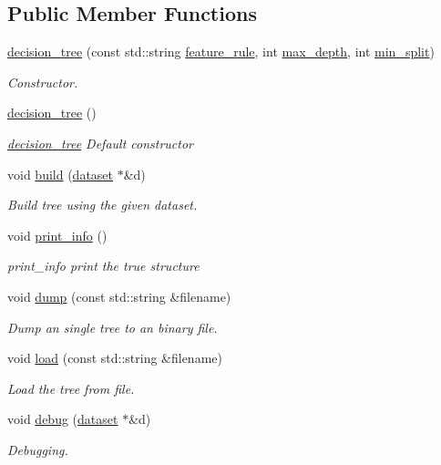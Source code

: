 \subsection*{Public Member Functions}
\begin{DoxyCompactItemize}
\item 
\hyperlink{classdecision__tree_ac90ebb549d50e49ec8322d6ee8335eb8}{decision\+\_\+tree} (const std\+::string \hyperlink{classtree_a5aba3b77a347165517a20d5fab94382d}{feature\+\_\+rule}, int \hyperlink{classtree_a0a9f968fac827d3239be67488c34fb21}{max\+\_\+depth}, int \hyperlink{classtree_ae70cd626c0b50a0b8306a94a9e5e8fd7}{min\+\_\+split})
\begin{DoxyCompactList}\small\item\em Constructor. \end{DoxyCompactList}\item 
\hyperlink{classdecision__tree_a37aab24549db438a742bd4952765757b}{decision\+\_\+tree} ()
\begin{DoxyCompactList}\small\item\em \hyperlink{classdecision__tree}{decision\+\_\+tree} Default constructor \end{DoxyCompactList}\item 
void \hyperlink{classdecision__tree_ad3286ad0d5361f3f19ddac966477b14a}{build} (\hyperlink{classdataset}{dataset} $\ast$\&d)
\begin{DoxyCompactList}\small\item\em Build tree using the given dataset. \end{DoxyCompactList}\item 
void \hyperlink{classdecision__tree_a14bf007c208bdbfe8488b0f568150c7b}{print\+\_\+info} ()
\begin{DoxyCompactList}\small\item\em print\+\_\+info print the true structure \end{DoxyCompactList}\item 
void \hyperlink{classdecision__tree_aafb34b6fe56b8cdcab7114f84dbbc01d}{dump} (const std\+::string \&filename)
\begin{DoxyCompactList}\small\item\em Dump an single tree to an binary file. \end{DoxyCompactList}\item 
void \hyperlink{classdecision__tree_aadf8e156057ff556a29316d537e2e8e9}{load} (const std\+::string \&filename)
\begin{DoxyCompactList}\small\item\em Load the tree from file. \end{DoxyCompactList}\item 
void \hyperlink{classdecision__tree_a738fa3b8ccbb86fea50d93acab273bde}{debug} (\hyperlink{classdataset}{dataset} $\ast$\&d)
\begin{DoxyCompactList}\small\item\em Debugging. \end{DoxyCompactList}\end{DoxyCompactItemize}
